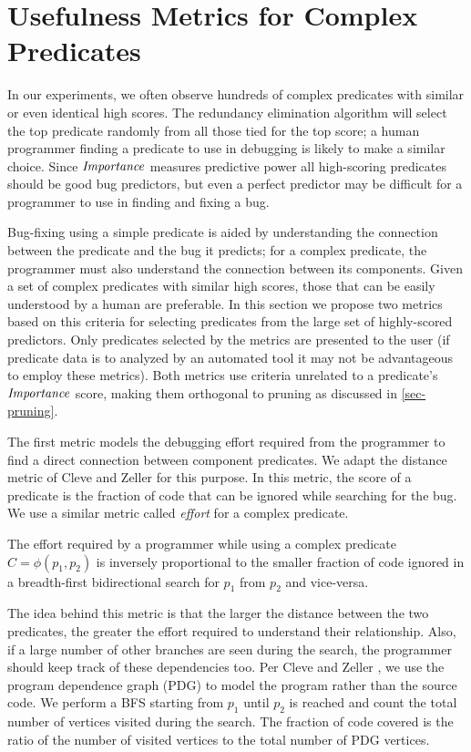
\section{Usefulness Metrics for Complex Predicates}
\label{sec-metrics}
In our experiments, we often observe hundreds of complex predicates with similar or even identical high scores.  The redundancy elimination algorithm will select the top predicate randomly from all those tied for the top score; a human programmer finding a predicate to use in debugging is likely to make a similar choice.  Since $\mathit{Importance}$ measures predictive power all high-scoring predicates should be good bug predictors, but even a perfect predictor may be difficult for a programmer to use in finding and fixing a bug.

Bug-fixing using a simple predicate is aided by understanding the connection between the predicate and the bug it predicts; for a complex predicate, the programmer must also understand the connection between its components.  Given a set of complex predicates with similar high scores, those that can be easily understood by a human are preferable.  In this section we propose two metrics based on this criteria for selecting predicates from the large set of highly-scored predictors.  Only predicates selected by the metrics are presented to the user (if predicate data is to analyzed by an automated tool it may not be advantageous to employ these metrics).  Both metrics use criteria unrelated to a predicate's $\mathit{Importance}$ score, making them orthogonal to pruning as discussed in \autoref{sec-pruning}.

The first metric models the debugging effort required from the programmer to find a direct connection between component predicates.  We adapt the distance metric of Cleve and Zeller \cite{1062522} for this purpose.  In this metric, the score of a predicate is the fraction of code that can be ignored while searching for the bug.  We use a similar metric called \emph{effort} for a complex predicate.

\begin{defn}
\label{def-effort}
The effort required by a programmer while using a complex predicate $C = \phi(p_1, p_2)$ is inversely proportional to the smaller fraction of code ignored in a breadth-first bidirectional search for $p_1$ from $p_2$ and vice-versa.
\end{defn}

The idea behind this metric is that the larger the distance between the two predicates, the greater the effort required to understand their relationship.  Also, if a large number of other branches are seen during the search, the programmer should keep track of these dependencies too.  Per Cleve and Zeller \cite{1062522}, we use the program dependence graph (PDG) to model the program rather than the source code. We perform a BFS starting from $p_1$ until $p_2$ is reached and count the total number of vertices visited during the search. The fraction of code covered is the ratio of the number of visited vertices to the total number of PDG vertices. 

